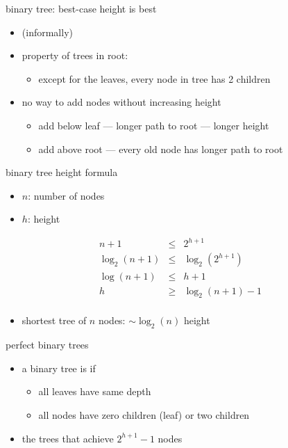 \begin{frame}{binary tree: best-case height is best}
\begin{itemize}
\item (informally)
\item property of trees in root:
    \begin{itemize}
        \item except for the leaves, every node in tree has 2 children
    \end{itemize}
\item no way to add nodes without increasing height
    \begin{itemize}
    \item add below leaf --- longer path to root --- longer height
    \item add above root --- every old node has longer path to root
    \end{itemize}
\end{itemize}
\end{frame}


\begin{frame}{binary tree height formula}
    \begin{itemize}
    \item $n$: number of nodes
    \item $h$: height
    \end{itemize}
\begin{eqnarray*}
    n + 1 &\le& 2^{h+1} \\
    \log_2(n+1) &\le& \log_2\left(2^{h+1}\right) \\
    \log(n+1) &\le& h+1 \\
    h &\ge& \log_2\left(n+1\right)-1 \\
\end{eqnarray*}
    \begin{itemize}
    \item shortest tree of $n$ nodes: $\sim \log_2(n)$ height
    \end{itemize}
\end{frame}

\begin{frame}{perfect binary trees}
    \begin{itemize}
    \item a binary tree is  if
        \begin{itemize}
        \item all leaves have same depth
        \item all nodes have zero children (leaf) or two children
        \end{itemize}
    \item {} the trees that achieve $2^{h+1}-1$ nodes
    \end{itemize}
\end{frame}
